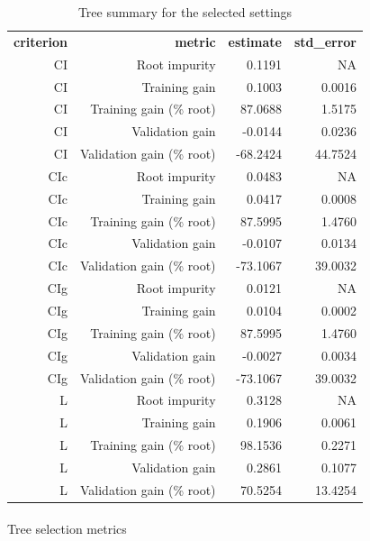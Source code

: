 \documentclass[
  11pt,
  a4paper,
]{article}
\makeatletter
\let\oldparagraph\paragraph
\renewcommand{\paragraph}{
    \@ifstar
      \xxxParagraphStar
      \xxxParagraphNoStar
  }
\newcommand{\xxxParagraphStar}[1]{\oldparagraph*{#1}\mbox{}}
\newcommand{\xxxParagraphNoStar}[1]{\oldparagraph{#1}\mbox{}}
\makeatother
\begin{document}
\begin{longtable}[t]{rrrr}

\caption{\label{tbl-appendix-tree-selected-setting-summary}Tree summary
for the selected settings}

\tabularnewline

\\
\toprule
\textbf{criterion} & \textbf{metric} & \textbf{estimate} & \textbf{std\_error}\\
\midrule
CI & Root impurity & 0.1191 & NA\\
CI & Training gain & 0.1003 & 0.0016\\
CI & Training gain (\% root) & 87.0688 & 1.5175\\
CI & Validation gain & -0.0144 & 0.0236\\
CI & Validation gain (\% root) & -68.2424 & 44.7524\\
\addlinespace
CIc & Root impurity & 0.0483 & NA\\
CIc & Training gain & 0.0417 & 0.0008\\
CIc & Training gain (\% root) & 87.5995 & 1.4760\\
CIc & Validation gain & -0.0107 & 0.0134\\
CIc & Validation gain (\% root) & -73.1067 & 39.0032\\
\addlinespace
CIg & Root impurity & 0.0121 & NA\\
CIg & Training gain & 0.0104 & 0.0002\\
CIg & Training gain (\% root) & 87.5995 & 1.4760\\
CIg & Validation gain & -0.0027 & 0.0034\\
CIg & Validation gain (\% root) & -73.1067 & 39.0032\\
\addlinespace
L & Root impurity & 0.3128 & NA\\
L & Training gain & 0.1906 & 0.0061\\
L & Training gain (\% root) & 98.1536 & 0.2271\\
L & Validation gain & 0.2861 & 0.1077\\
L & Validation gain (\% root) & 70.5254 & 13.4254\\
\bottomrule

\end{longtable}

\endgroup{}

\paragraph{Tree selection metrics}\label{tree-selection-metrics}
\end{document}
